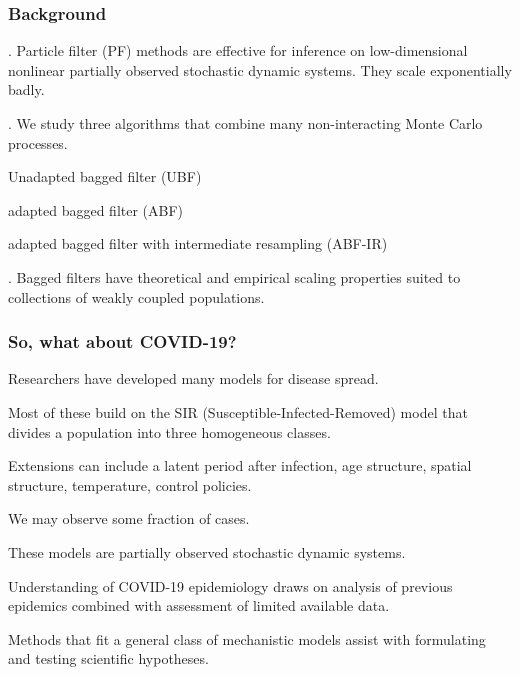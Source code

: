 \documentclass{beamer}
\begin{document}
\begin{frame}
  \frametitle{Background}

  . Particle filter (PF) methods are effective for inference on low-dimensional nonlinear partially observed stochastic dynamic systems. They scale exponentially badly.

  \vspace{10mm}
  
  . We study three algorithms that combine many non-interacting Monte Carlo processes.

  \vspace{3mm}
  
  \begin{myitemize}
  \item Unadapted bagged filter (UBF)
  \item adapted bagged filter (ABF)
    \item adapted bagged filter with intermediate resampling (ABF-IR)
  \end{myitemize}

  \vspace{10mm}

  . Bagged filters have theoretical and empirical scaling properties suited to collections of weakly coupled populations.

\end{frame}
\begin{frame}

  \frametitle{So, what about COVID-19?}

  \begin{myitemize}
  \item Researchers have developed many models for disease spread.
  \item Most of these build on the SIR (Susceptible-Infected-Removed) model that divides a population into three homogeneous classes.
    \item Extensions can include a latent period after infection, age structure, spatial structure, temperature, control policies.
    \item We may observe some fraction of cases.
    \item These models are partially observed stochastic dynamic systems.      
    \item Understanding of COVID-19 epidemiology draws on analysis of previous epidemics combined with assessment of limited available data.
      \item Methods that fit a general class of mechanistic models assist with formulating and testing scientific hypotheses.
      \end{myitemize}

\end{frame}
\end{document}
